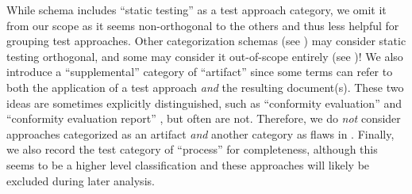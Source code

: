 
While  schema includes ``static testing'' as a test approach
category, we omit it from our scope as it seems non-orthogonal to the others
and thus less helpful for grouping test approaches. \ifnotpaper Other
    categorization schemas (see ) may consider static testing
    orthogonal, and some may consider it out-of-scope entirely (see
    )! \fi We also introduce a ``supplemental'' category of
``artifact'' since some terms can refer to both the
application of a test approach \emph{and} the resulting document(s).
\ifnotpaper
    These two ideas are sometimes explicitly distinguished, such as
    ``conformity evaluation'' and ``conformity evaluation report''
    \citep{ISO_IEC2014}, but often are not.
\fi
Therefore, we do \emph{not} consider approaches categorized as an artifact
\emph{and} another category as flaws in .
Finally, we also record the test category of ``process'' for completeness,
although this seems to be a higher level classification and these approaches
will likely be excluded during later analysis.

\ifnotpaper
    \begin{landscape}
        \begin{table*}[p]
            \ieeeCatsTable{}
        \end{table*}
    \end{landscape}
\fi


